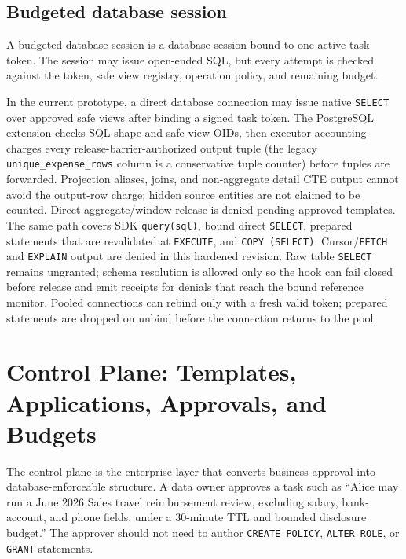 \documentclass[journal]{IEEEtran}
\begin{document}
\hypertarget{budgeted-database-session}{%
\subsection{Budgeted database
session}\label{budgeted-database-session}}

A budgeted database session is a database session bound to one active
task token. The session may issue open-ended SQL, but every attempt is
checked against the token, safe view registry, operation policy, and
remaining budget.

In the current prototype, a direct database connection may issue native
\texttt{SELECT} over approved safe views after binding a signed task
token. The PostgreSQL extension checks SQL shape and safe-view OIDs,
then executor accounting charges every release-barrier-authorized output
tuple (the legacy \texttt{unique\_expense\_rows} column is a conservative
tuple counter) before tuples are forwarded. Projection aliases, joins, and
non-aggregate detail CTE output cannot avoid the output-row charge;
hidden source entities are not claimed to be counted. Direct
aggregate/window release is denied pending approved templates. The same
path covers SDK
\texttt{query(sql)}, bound direct \texttt{SELECT}, prepared statements
that are revalidated at \texttt{EXECUTE}, and \texttt{COPY (SELECT)}.
Cursor/\texttt{FETCH} and \texttt{EXPLAIN} output are denied in this
hardened revision. Raw table \texttt{SELECT} remains ungranted; schema
resolution is allowed only so the hook can fail closed before release and
emit receipts for denials that reach the bound reference monitor.
Pooled connections can rebind only with a fresh valid token; prepared
statements are dropped on unbind before the connection returns to the pool.


\hypertarget{control-plane-templates-applications-approvals-and-budgets}{%
\section{Control Plane: Templates, Applications, Approvals, and
Budgets}\label{control-plane-templates-applications-approvals-and-budgets}}

The control plane is the enterprise layer that converts business
approval into database-enforceable structure. A data owner approves a
task such as ``Alice may run a June 2026 Sales travel reimbursement
review, excluding salary, bank-account, and phone fields, under a
30-minute TTL and bounded disclosure budget.'' The approver should not
need to author \texttt{CREATE POLICY}, \texttt{ALTER ROLE}, or
\texttt{GRANT} statements.
\end{document}
